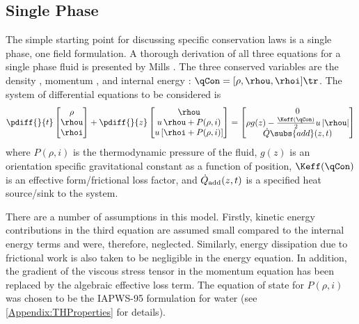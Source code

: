 \subsection{Single Phase}
The simple starting point for discussing specific conservation laws is a single phase, one field formulation.
A thorough derivation of all three equations for a single phase fluid is presented by Mills \cite[pg. 451]{mills_heat_1994}.
The three conserved variables are the density \rho, momentum \rhou, and internal energy \rhoi:  $\qCon = [\rho,\rhou,\rhoi]\tr$.
The system of differential equations to be considered is
\begin{equation}
    \pdiff{}{t}\begin{bmatrix}
                   \rho \\
                   \rhou \\
                   \rhoi 
                \end{bmatrix}
    + 
    \pdiff{}{z}\begin{bmatrix}
                    \rhou                 \\
                    u\,\rhou + P(\rho,i)   \\
                    u\left[\rhoi  + P(\rho,i)\right]
                \end{bmatrix}
             =  
    \begin{bmatrix}
        0 \\%
        \rho{g(z)} - \frac{\Keff(\qCon)}{2} u\,|\rhou|  \\
        \dot{Q}\subs{add}(z,t)
    \end{bmatrix}
    \label{Eqn:HEMBasic}
\end{equation}
where $P(\rho,i)$ is the thermodynamic pressure of the fluid, $g(z)$ is an orientation specific gravitational constant as a function of position, $\Keff(\qCon)$ is an effective form/frictional loss factor, and $\dot{Q}_{\mbox{\scriptsize{add}}}(z,t)$ is a specified heat source/sink to the system.

There are a number of assumptions in this model.  
Firstly, kinetic energy contributions in the third equation are assumed small compared to the internal energy terms and were, therefore, neglected.
Similarly, energy dissipation due to frictional work is also taken to be negligible in the energy equation.
In addition, the gradient of the viscous stress tensor in the momentum equation has been replaced by the algebraic effective loss term.  The equation of state for $P(\rho,i)$ was chosen to be the IAPWS-95 formulation for water (see \cref{Appendix:THProperties} for details).

